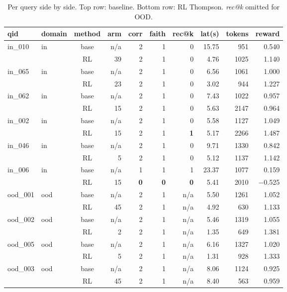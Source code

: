 \documentclass{article}
\begin{document}
\begin{table}[t]
\centering
\caption{Per query side by side. Top row: baseline. Bottom row: RL Thompson. \textit{rec@k} omitted for OOD.}
\label{tab:perquery}
\scriptsize
\begin{tabular}{llcrrrrrrr}
\toprule
qid & domain & method & arm & corr & faith & rec@k & lat(s) & tokens & reward \\
\midrule
\multirow{2}{*}{in\_010}  & in & base   & n/a   & 2 & 1 & 0 & 15.75 & 951  & 0.540 \\
                          &    & RL     & 39    & 2 & 1 & 0 & 4.76  & 1025 & 1.140 \\
\multirow{2}{*}{in\_065}  & in & base   & n/a   & 2 & 1 & 0 & 6.56  & 1061 & 1.000 \\
                          &    & RL     & 23    & 2 & 1 & 0 & 3.02  & 944  & 1.227 \\
\multirow{2}{*}{in\_062}  & in & base   & n/a   & 2 & 1 & 0 & 7.43  & 1022 & 0.957 \\
                          &    & RL     & 15    & 2 & 1 & 0 & 5.63  & 2147 & 0.964 \\
\multirow{2}{*}{in\_002}  & in & base   & n/a   & 2 & 1 & 0 & 5.58  & 1127 & 1.049 \\
                          &    & RL     & 15    & 2 & 1 & \textbf{1} & 5.17  & 2266 & 1.487 \\
\multirow{2}{*}{in\_046}  & in & base   & n/a   & 2 & 1 & 0 & 9.71  & 1330 & 0.842 \\
                          &    & RL     & 5     & 2 & 1 & 0 & 5.12  & 1137 & 1.142 \\
\multirow{2}{*}{in\_006}  & in & base   & n/a   & 1 & 1 & 1 & 23.37 & 1077 & 0.159 \\
                          &    & RL     & 15    & \textbf{0} & \textbf{0} & \textbf{0} & 5.41  & 2010 & $-$0.525 \\
\multirow{2}{*}{ood\_001} & ood & base  & n/a   & 2 & 1 & n/a & 5.50 & 1261 & 1.052 \\
                          &     & RL    & 45    & 2 & 1 & n/a & 4.92 & 630  & 1.133 \\
\multirow{2}{*}{ood\_002} & ood & base  & n/a   & 2 & 1 & n/a & 5.46 & 1319 & 1.055 \\
                          &     & RL    & 2     & 2 & 1 & n/a & 1.35 & 649  & 1.381 \\
\multirow{2}{*}{ood\_005} & ood & base  & n/a   & 2 & 1 & n/a & 6.16 & 1327 & 1.020 \\
                          &     & RL    & 5     & 2 & 1 & n/a & 1.31 & 928  & 1.333 \\
\multirow{2}{*}{ood\_003} & ood & base  & n/a   & 2 & 1 & n/a & 8.06 & 1124 & 0.925 \\
                          &     & RL    & 45    & 2 & 1 & n/a & 8.40 & 563  & 0.959 \\
\bottomrule
\end{tabular}
\end{table}
\end{document}
